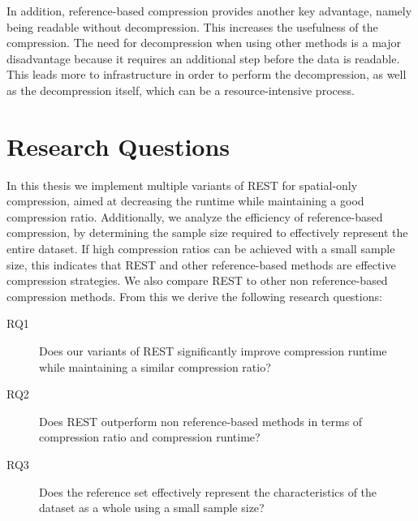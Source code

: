 In addition, reference-based compression provides another key advantage, namely being readable without decompression. This increases the usefulness of the compression. The need for decompression when using other methods is a major disadvantage because it requires an additional step before the data is readable. This leads more to infrastructure in order to perform the decompression, as well as the decompression itself, which can be a resource-intensive process.

\section{Research Questions}
\label{sec:questions}
In this thesis we implement multiple variants of REST for spatial-only compression, aimed at decreasing the runtime while maintaining a good compression ratio. Additionally, we analyze the efficiency of reference-based compression, by determining the sample size required to effectively represent the entire dataset. If high compression ratios can be achieved with a small sample size, this indicates that REST and other reference-based methods are effective compression strategies. We also compare REST to other non reference-based compression methods. From this we derive the following research questions:

\begin{description}
    \item[RQ1] Does our variants of REST significantly improve compression runtime while maintaining a similar compression ratio?
    \item[RQ2] Does REST outperform non reference-based methods in terms of compression ratio and compression runtime?
    \item[RQ3] Does the reference set effectively represent the characteristics of the dataset as a whole using a small sample size?
\end{description}

